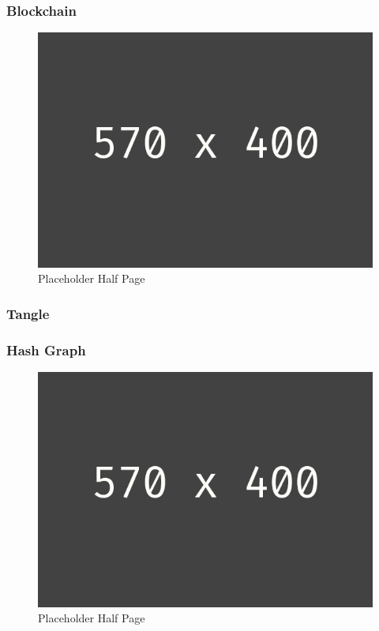 \subsubsection{Blockchain}
\begin{figure}[h!]
	\centering
	\includegraphics[width=1.0\linewidth]{pictures/placeholder_half_page}
	\caption[Placeholder Half Page]{Placeholder Half Page}
	\label{fig:placeholder_half_page}
\end{figure}


\subsubsection{Tangle}


\subsubsection{Hash Graph}
\begin{figure}[h!]
	\centering
	\includegraphics[width=1.0\linewidth]{pictures/placeholder_half_page}
	\caption[Placeholder Half Page]{Placeholder Half Page}
	\label{fig:placeholder_half_page}
\end{figure}


